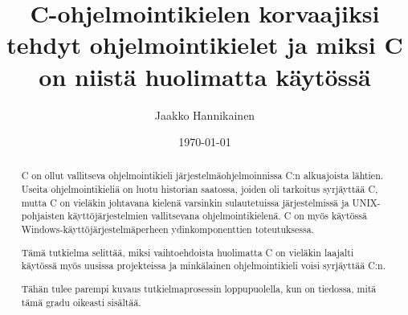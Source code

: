 \documentclass[gradu]{tktltiki}
\begin{document}
\title{C-ohjelmointikielen korvaajiksi tehdyt ohjelmointikielet ja miksi C on
niistä huolimatta käytössä}
\author{Jaakko Hannikainen}
\date{\today}

\maketitle




\begin{abstract}
    C on ollut vallitseva ohjelmointikieli järjestelmäohjelmoinnissa C:n
    alkuajoista lähtien. Useita ohjelmointikieliä on luotu historian saatossa,
    joiden oli tarkoitus syrjäyttää C, mutta C on vieläkin johtavana kielenä
    varsinkin sulautetuissa järjestelmissä ja UNIX-pohjaisten
    käyttöjärjestelmien vallitsevana ohjelmointikielenä. C on myös käytössä
    Windows-käyttöjärjestelmäperheen ydinkomponenttien toteutuksessa.
    
    Tämä tutkielma selittää, miksi vaihtoehdoista huolimatta C on vieläkin
    laajalti käytössä myös uusissa projekteissa ja minkälainen ohjelmointikieli
    voisi syrjäyttää C:n.
    
    Tähän tulee parempi kuvaus tutkielmaprosessin loppupuolella, kun on
    tiedossa, mitä tämä gradu oikeasti sisältää.
\end{abstract}

\mytableofcontents


\newpage

\newpage

\begingroup
\renewcommand{\section}[2]{}%


\endgroup

%
%
%
\end{document}
